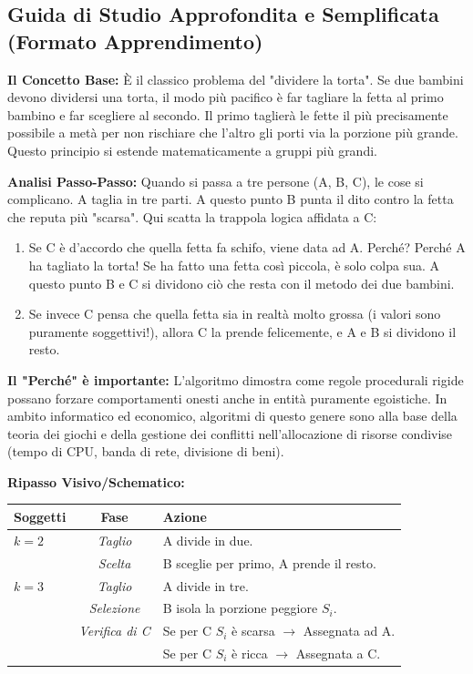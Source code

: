 \documentclass[a4paper, 11pt]{report}
\begin{document}
\vspace{0.5cm}
\subsection*{Guida di Studio Approfondita e Semplificata (Formato Apprendimento)}

\textbf{Il Concetto Base:}
È il classico problema del "dividere la torta". Se due bambini devono dividersi una torta, il modo più pacifico è far tagliare la fetta al primo bambino e far scegliere al secondo. Il primo taglierà le fette il più precisamente possibile a metà per non rischiare che l'altro gli porti via la porzione più grande. Questo principio si estende matematicamente a gruppi più grandi.

\textbf{Analisi Passo-Passo:}
Quando si passa a tre persone (A, B, C), le cose si complicano.
A taglia in tre parti. A questo punto B punta il dito contro la fetta che reputa più "scarsa".
Qui scatta la trappola logica affidata a C:
\begin{enumerate}
\item Se C è d'accordo che quella fetta fa schifo, viene data ad A. Perché? Perché A ha tagliato la torta! Se ha fatto una fetta così piccola, è solo colpa sua. A questo punto B e C si dividono ciò che resta con il metodo dei due bambini.
\item Se invece C pensa che quella fetta sia in realtà molto grossa (i valori sono puramente soggettivi!), allora C la prende felicemente, e A e B si dividono il resto.
\end{enumerate}

\textbf{Il "Perché" è importante:}
L'algoritmo dimostra come regole procedurali rigide possano forzare comportamenti onesti anche in entità puramente egoistiche. In ambito informatico ed economico, algoritmi di questo genere sono alla base della teoria dei giochi e della gestione dei conflitti nell'allocazione di risorse condivise (tempo di CPU, banda di rete, divisione di beni).

\textbf{Ripasso Visivo/Schematico:}
\begin{center}
\begin{tabular}{|l|c|p{8cm}|}
\hline
\textbf{Soggetti} & \textbf{Fase} & \textbf{Azione} \\
\hline
$k=2$ & \textit{Taglio} & A divide in due. \\
& \textit{Scelta} & B sceglie per primo, A prende il resto. \\
\hline
$k=3$ & \textit{Taglio} & A divide in tre. \\
& \textit{Selezione} & B isola la porzione peggiore $S_i$. \\
& \textit{Verifica di C} & Se per C $S_i$ è scarsa $\rightarrow$ Assegnata ad A. \\
& & Se per C $S_i$ è ricca $\rightarrow$ Assegnata a C. \\
\hline
\end{tabular}
\end{center}
\end{document}
